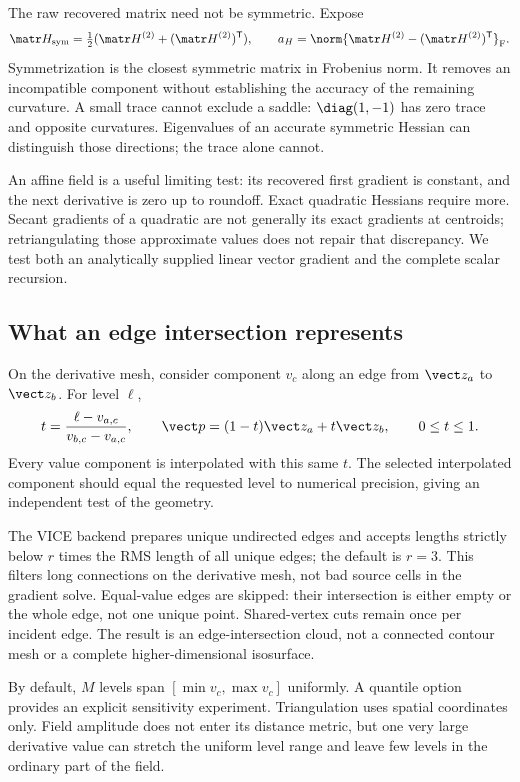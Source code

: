 The raw recovered matrix need not be symmetric. Expose
\begin{equation}
 \matr H_{\mathrm{sym}}=\tfrac12(\matr H^{(2)}+
          (\matr H^{(2)})^{\mathsf T}),\qquad
 a_H=\norm{\matr H^{(2)}-(\matr H^{(2)})^{\mathsf T}}_{\mathrm F}.
 \label{eq:symmetry}
\end{equation}
Symmetrization is the closest symmetric matrix in Frobenius norm.
It removes an incompatible component without establishing the accuracy of
the remaining curvature. A small trace cannot exclude a saddle:
$\diag(1,-1)$ has zero trace and opposite curvatures. Eigenvalues of an
accurate symmetric Hessian can distinguish those directions; the trace alone
cannot.

An affine field is a useful limiting test: its recovered first gradient is
constant, and the next derivative is zero up to roundoff. Exact quadratic
Hessians require more. Secant gradients of a quadratic are not generally its
exact gradients at centroids; retriangulating those approximate values does
not repair that discrepancy. We test both an analytically supplied linear
vector gradient and the complete scalar recursion.

\subsection{What an edge intersection represents}
On the derivative mesh, consider component $v_c$ along an edge from
$\vect z_a$ to $\vect z_b$. For level $\ell$,
\begin{equation}
 t=\frac{\ell-v_{a,c}}{v_{b,c}-v_{a,c}},\qquad
 \vect p=(1-t)\vect z_a+t\vect z_b,\qquad 0\leq t\leq1.
 \label{eq:intersection}
\end{equation}
Every value component is interpolated with this same $t$. The selected
interpolated component should equal the requested level to numerical
precision, giving an independent test of the geometry.

The VICE backend prepares unique undirected edges and accepts lengths strictly
below $r$ times the RMS length of all unique edges; the default is $r=3$.
This filters long connections on the derivative mesh, not bad source cells
in the gradient solve. Equal-value edges are skipped: their intersection is
either empty or the whole edge, not one unique point. Shared-vertex cuts
remain once per incident edge. The result is an edge-intersection cloud,
not a connected contour mesh or a complete higher-dimensional isosurface.

By default, $M$ levels span $[\min v_c,\max v_c]$ uniformly. A quantile option
provides an explicit sensitivity experiment. Triangulation uses spatial
coordinates only. Field amplitude does not enter its distance metric, but
one very large derivative value can stretch the uniform level range and
leave few levels in the ordinary part of the field.

